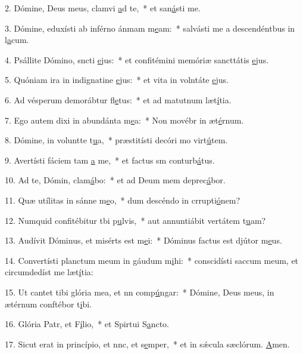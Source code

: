 2. Dómine, Deus meus, clamvi \uline{a}d te,~* et san\uline{á}sti me.\par 
3. Dómine, eduxísti ab inférno ánmam m\uline{e}am:~* salvásti me a descendéntbus in l\uline{a}cum.\par 
4. Psállite Dómino, sncti \uline{e}jus:~* et confitémini memóriæ sancttátis \uline{e}jus.\par 
5. Quóniam ira in indignatine \uline{e}jus:~* et vita in volntáte \uline{e}jus.\par 
6. Ad vésperum demorábtur fl\uline{e}tus:~* et ad matutnum læt\uline{í}tia.\par 
7. Ego autem dixi in abundánta m\uline{e}a:~* Non movébr in æt\uline{é}rnum.\par 
8. Dómine, in voluntte t\uline{u}a,~* præstitísti decóri mo virt\uline{ú}tem.\par 
9. Avertísti fáciem tam \uline{a} me,~* et factus sm conturb\uline{á}tus.\par 
10. Ad te, Dómin, clam\uline{á}bo:~* et ad Deum mem deprec\uline{á}bor.\par 
11. Quæ utílitas in sánne m\uline{e}o,~* dum descéndo in crrupti\uline{ó}nem?\par 
12. Numquid confitébitur tbi p\uline{u}lvis,~* aut annuntiábit vertátem t\uline{u}am?\par 
13. Audívit Dóminus, et misérts est m\uline{e}i:~* Dóminus factus est djútor m\uline{e}us.\par 
14. Convertísti planctum meum in gáudum m\uline{i}hi:~* conscidísti saccum meum, et circumdedíst me læt\uline{í}tia:\par 
15. Ut cantet tibi glória mea, et nn comp\uline{ú}ngar:~* Dómine, Deus meus, in ætérnum conftébor t\uline{i}bi.\par 
16. Glória Patr, et F\uline{í}lio,~* et Spirtui S\uline{a}ncto.\par 
17. Sicut erat in princípio, et nnc, et s\uline{e}mper,~* et in sǽcula sæclórum. \uline{A}men.\par 
